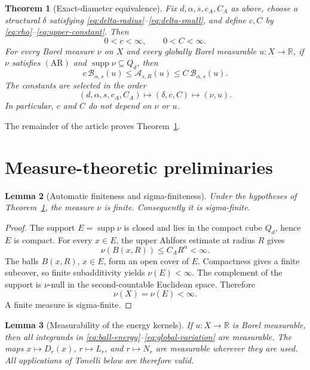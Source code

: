 \documentclass[11pt]{article}
\newtheorem{theorem}{Theorem}[section]
\newtheorem{lemma}[theorem]{Lemma}
\theoremstyle{remark}
\newcommand{\supp}{\operatorname{supp}}
\newcommand{\Aenergy}{\mathcal A}
\newcommand{\Benergy}{\mathcal B}
\newcommand{\Cube}{Q_d}
\begin{document}
\begin{theorem}[Exact-diameter equivalence]                               \label{thm:main}
Fix \(d,\alpha,s,c_A,C_A\) as above, choose a structural \(\delta\)
satisfying \eqref{eq:delta-radius}--\eqref{eq:delta-small}, and define
\(c,C\) by \eqref{eq:rho}--\eqref{eq:upper-constant}.  Then
\[
  0<c<\infty,\qquad 0<C<\infty.
\]
For every Borel measure \(\nu\) on \(X\) and every globally Borel
measurable \(u:X\to\mathbb R\), if \(\nu\) satisfies \((\mathrm{AR})\) and
\(\supp\nu\subseteq\Cube\), then
\begin{equation}
  c\,\Benergy_{\alpha,s}(u)
  \leq
  \Aenergy_{s,R}(u)
  \leq
  C\,\Benergy_{\alpha,s}(u).                                             \label{eq:main-comparison}
\end{equation}
The constants are selected in the order
\[
  (d,\alpha,s,c_A,C_A)
  \longmapsto
  (\delta,c,C)
  \longmapsto
  (\nu,u).
\]
In particular, \(c\) and \(C\) do not depend on \(\nu\) or \(u\).
\end{theorem}

The remainder of the article proves Theorem~\ref{thm:main}.

\section{Measure-theoretic preliminaries}

\begin{lemma}[Automatic finiteness and sigma-finiteness]                  \label{lem:finite-measure}
Under the hypotheses of Theorem~\ref{thm:main}, the measure \(\nu\) is
finite.  Consequently it is sigma-finite.
\end{lemma}

\begin{proof}
The support \(E=\supp\nu\) is closed and lies in the compact cube
\(\Cube\), hence \(E\) is compact.  For every \(x\in E\), the upper
Ahlfors estimate at radius \(R\) gives
\[
  \nu(B(x,R))
  \leq C_A R^\alpha
  <\infty.
\]
The balls \(B(x,R)\), \(x\in E\), form an open cover of \(E\).  Compactness
gives a finite subcover, so finite subadditivity yields \(\nu(E)<\infty\).
The complement of the support is \(\nu\)-null in the second-countable
Euclidean space.  Therefore
\[
  \nu(X)=\nu(E)<\infty.
\]
A finite measure is sigma-finite.
\end{proof}

\begin{lemma}[Measurability of the energy kernels]                         \label{lem:measurability}
If \(u:X\to\mathbb R\) is Borel measurable, then all integrands in
\eqref{eq:ball-energy}--\eqref{eq:global-variation} are measurable.  The
maps \(x\mapsto D_r(x)\), \(r\mapsto L_r\), and \(r\mapsto N_r\) are
measurable wherever they are used.  All applications of Tonelli below are
therefore valid.
\end{lemma}
\end{document}
